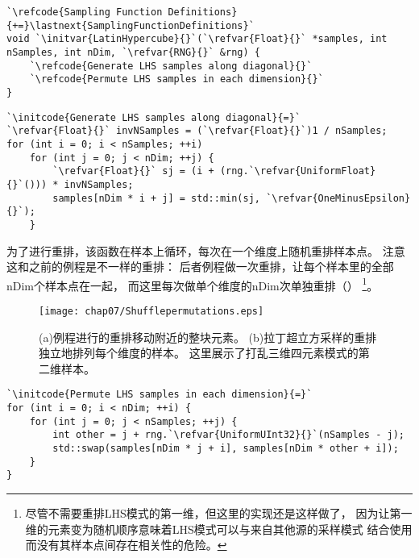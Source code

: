 \begin{lstlisting}
`\refcode{Sampling Function Definitions}{+=}\lastnext{SamplingFunctionDefinitions}`
void `\initvar{LatinHypercube}{}`(`\refvar{Float}{}` *samples, int nSamples, int nDim, `\refvar{RNG}{}` &rng) {
    `\refcode{Generate LHS samples along diagonal}{}`
    `\refcode{Permute LHS samples in each dimension}{}`
}
\end{lstlisting}
\begin{lstlisting}
`\initcode{Generate LHS samples along diagonal}{=}`
`\refvar{Float}{}` invNSamples = (`\refvar{Float}{}`)1 / nSamples;
for (int i = 0; i < nSamples; ++i)
    for (int j = 0; j < nDim; ++j) {
        `\refvar{Float}{}` sj = (i + (rng.`\refvar{UniformFloat}{}`())) * invNSamples;
        samples[nDim * i + j] = std::min(sj, `\refvar{OneMinusEpsilon}{}`);
    }
\end{lstlisting}

为了进行重排，该函数在样本上循环，每次在一个维度上随机重排样本点。
注意这和之前的例程是不一样的重排：
后者例程做一次重排，让每个样本里的全部{\ttfamily nDim}个样本点在一起，
而这里每次做单个维度的{\ttfamily nDim}次单独重排（）
\footnote{尽管不需要重排LHS模式的第一维，但这里的实现还是这样做了，
    因为让第一维的元素变为随机顺序意味着LHS模式可以与来自其他源的采样模式
    结合使用而没有其样本点间存在相关性的危险。}。
\begin{figure}[htbp]
    \centering\texttt{[image: chap07/Shufflepermutations.eps]}
    \caption{(a)例程进行的重排移动附近的整块元素。
        (b)拉丁超立方采样的重排独立地排列每个维度的样本。
        这里展示了打乱三维四元素模式的第二维样本。}
    \label{fig:7.22}
\end{figure}

\begin{lstlisting}
`\initcode{Permute LHS samples in each dimension}{=}`
for (int i = 0; i < nDim; ++i) {
    for (int j = 0; j < nSamples; ++j) {
        int other = j + rng.`\refvar{UniformUInt32}{}`(nSamples - j);
        std::swap(samples[nDim * j + i], samples[nDim * other + i]);
    }
}
\end{lstlisting}

